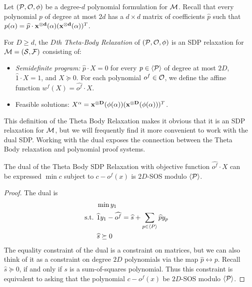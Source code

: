 Let $(\mathcal P, \mathcal O, \phi)$ be a degree-$d$ polynomial formulation for $\mathcal M$. Recall that every polynomial $p$ of degree at most $2d$ has a $d \times d$ matrix of coefficients $\widehat{p}$ such that $p(\alpha) = \widehat{p} \cdot \mathbf{x^{\otimes d}}(\alpha)(\mathbf{x^{\otimes d}}(\alpha))^T$.
\begin{definition}
For $D \geq d$, the \emph{$D$th Theta-Body Relaxation} of $(\mathcal P,\mathcal O,\phi)$ is an SDP relaxation for $\mathcal M = (\mathcal S, \mathcal F)$ consisting of: 
\begin{itemize}
\item \emph{Semidefinite program:} $\widehat{p} \cdot X = 0$ for every $p \in \langle \mathcal P \rangle$ of degree at most $2D$, $\widehat{1} \cdot X = 1$, and $X \succeq 0$. For each polynomial $o^f \in \mathcal O$, we define the affine function $w^f(X) = \widehat{o^f} \cdot X$.
\item Feasible solutions: $X^\alpha = \mathbf{x^{\otimes D}}(\phi(\alpha))(\mathbf{x^{\otimes D}}(\phi(\alpha)))^T$.
\end{itemize}
\end{definition}
This definition of the Theta Body Relaxation makes it obvious that it is an SDP relaxation for $\mathcal M$, but we will frequently find it more convenient to work with the dual SDP. Working with the dual exposes the connection between the Theta Body relaxation and polynomial proof systems.
\begin{lemma}
The dual of the Theta Body SDP Relaxation with objective function $\widehat{o^f} \cdot X$ can be expressed $\min c$ subject to $c - o^f(x)$ is $2D$-SOS modulo $\langle \mathcal P \rangle$.
\end{lemma}
\begin{proof}
The dual is
\begin{align*}
&\min y_1 \\
\text{s.t. }&\widehat{1}y_1 - \widehat{o^f} = \widehat{s} + \sum_{p \in \langle P \rangle} \widehat{p}y_p \\
&\widehat{s} \succeq 0
\end{align*}
The equality constraint of the dual is a constraint on matrices, but we can also think of it as a constraint on degree $2D$ polynomials via the map $\widehat{p} \leftrightarrow p$. Recall $\widehat{s} \succeq 0$, if and only if $s$ is a sum-of-squares polynomial. Thus this constraint is equivalent to asking that the polynomial $c - o^f(x)$ be $2D$-SOS modulo $\langle \mathcal P \rangle$.
\end{proof}

